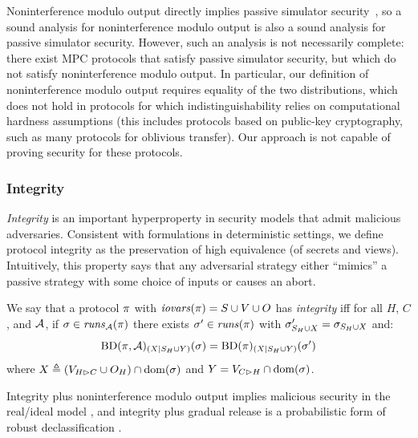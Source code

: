 Noninterference modulo output directly implies passive simulator
security~\cite{skalka-near-ppdp24}, so a sound analysis for
noninterference modulo output is also a sound analysis for passive
simulator security. However, such an analysis is not necessarily
complete: there exist MPC protocols that satisfy passive simulator
security, but which do not satisfy noninterference modulo output. In
particular, our definition of noninterference modulo output requires
equality of the two distributions, which does not hold in protocols
for which indistinguishability relies on computational hardness
assumptions (this includes protocols based on public-key cryptography,
such as many protocols for oblivious transfer). Our approach is not
capable of proving security for these protocols.

\subsubsection{Integrity}

\emph{Integrity} is an important hyperproperty in security models that
admit malicious adversaries. Consistent with formulations in
deterministic settings, we define protocol integrity as the
preservation of high equivalence (of secrets and views). Intuitively,
this property says that any adversarial strategy either ``mimics'' a
passive strategy with some choice of inputs or causes an abort.
\begin{definition}[Integrity]
  \label{def-integrity}
  We say that a protocol $\pi$ with $\mathit{iovars}(\pi) = S \cup V \cup O$ has
  \emph{integrity} iff for all $H$, $C$, and $\mathcal{A}$,
  if $\sigma \in \mathit{runs}_{\mathcal{A}}(\pi)$ there exists $\sigma' \in \mathit{runs}(\pi)$ with
  $\sigma_{S_H \cup X}' = \sigma_{S_H \cup X}$ and:
    $$
    \mathrm{BD}(\pi,\mathcal{A})_{({X}|{S_H \cup Y})}(\sigma) =
    \mathrm{BD}(\pi)_{({X}|{S_H \cup Y})}(\sigma')
    $$ 
  where $X \triangleq (V_{H \rhd C} \cup O_H) \cap \mathrm{dom}(\sigma)$ and $Y = V_{C \rhd H} \cap \mathrm{dom}(\sigma)$. 
\end{definition}
Integrity plus noninterference modulo output implies malicious security
in the real/ideal model \cite{skalka-near-ppdp24}, and integrity plus
gradual release is a probabilistic form of robust declassification
\cite{sabelfeld2009declassification}.

